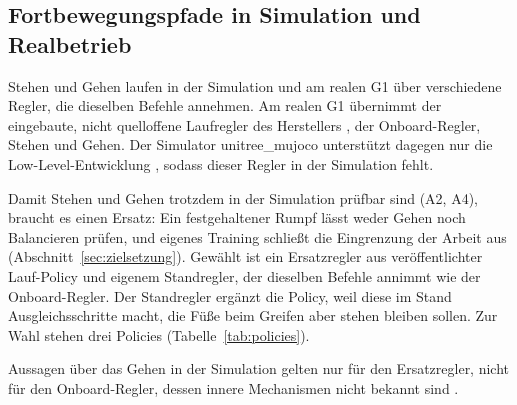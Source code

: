 \subsection{Fortbewegungspfade in Simulation und Realbetrieb}
\label{sec:fortbewegungspfade}
Stehen und Gehen laufen in der Simulation und am realen G1 über verschiedene Regler, die dieselben Befehle annehmen.
Am realen G1 übernimmt der eingebaute, nicht quelloffene Laufregler des Herstellers \cite{Hu2026}, der Onboard-Regler, Stehen und Gehen.
Der Simulator unitree\_mujoco unterstützt dagegen nur die Low-Level-Entwicklung \cite{UnitreeMujoco}, sodass dieser Regler in der Simulation fehlt.

Damit Stehen und Gehen trotzdem in der Simulation prüfbar sind (A2, A4), braucht es einen Ersatz: Ein festgehaltener Rumpf lässt weder Gehen noch Balancieren prüfen, und eigenes Training schließt die Eingrenzung der Arbeit aus (Abschnitt~\ref{sec:zielsetzung}).
Gewählt ist ein Ersatzregler aus veröffentlichter Lauf-Policy und eigenem Standregler, der dieselben Befehle annimmt wie der Onboard-Regler.
Der Standregler ergänzt die Policy, weil diese im Stand Ausgleichsschritte macht, die Füße beim Greifen aber stehen bleiben sollen. Zur Wahl stehen drei Policies (Tabelle~\ref{tab:policies}).

Aussagen über das Gehen in der Simulation gelten nur für den Ersatzregler, nicht für den Onboard-Regler, dessen innere Mechanismen nicht bekannt sind \cite{Hu2026}.

